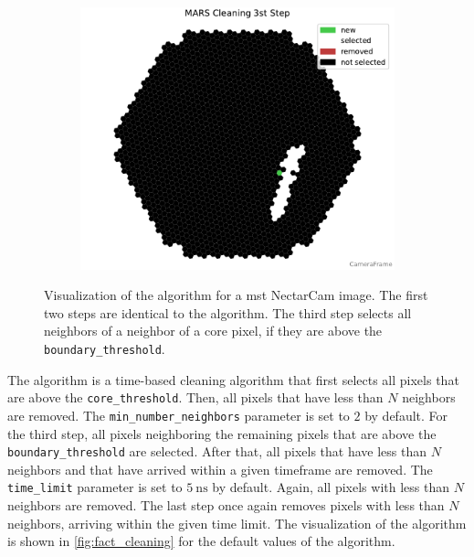 \begin{figure}
\begin{subfigure}[t]{0.32\textwidth}
    \end{subfigure}
    \hfill
    \begin{subfigure}[t]{0.32\textwidth}
        \includegraphics[width=\textwidth]{plots/cleaner_steps/mars_3.pdf}
    \end{subfigure}
    \caption{Visualization of the \mars{} algorithm for a \gls{mst} NectarCam image. The first two
    steps are identical to the \tailcuts{} algorithm. The third step selects all neighbors of a neighbor of a
    core pixel, if they are above the \texttt{boundary\_threshold}.}
    \label{fig:mars_cleaning}
\end{figure}

The \fact{} algorithm is a time-based cleaning algorithm that first selects all pixels that are above
the \texttt{core\_threshold}. Then, all pixels that have less than \(N\) neighbors are removed. The
\texttt{min\_number\_neighbors} parameter is set to \(\num{2}\) by default. For the third step, all pixels neighboring
the remaining pixels that are above the \texttt{boundary\_threshold} are selected. After that, all
pixels that have less than \(N\) neighbors and that have arrived within a given timeframe are removed.
The \texttt{time\_limit} parameter is set to \(\SI{5}{\nano\second}\) by default. Again, all pixels
with less than \(N\) neighbors are removed. The last step once again removes pixels with less than
\(N\) neighbors, arriving within the given time limit. The visualization of the algorithm is shown in
\autoref{fig:fact_cleaning} for the default values of the algorithm.


